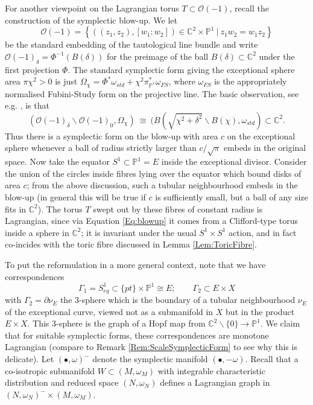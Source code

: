 \documentclass[reqno,10pt]{amsart}
\numberwithin{equation}{section}
\newcommand{\bC}{{\mathbb C}}
\newcommand{\bP}{{\mathbb P}}
\theoremstyle{remark}
\begin{document}
For another viewpoint on the Lagrangian torus $T \subset \mathcal{O}(-1)$, recall the construction of the symplectic blow-up.  We let 
\[
\mathcal{O}(-1) = \left \{ ((z_1,z_2), [w_1:w_2]) \in \bC^2 \times \bP^1 \ \big| \ z_1w_2=w_1z_2\right\}
\]
be the standard embedding of the tautological line bundle and write $\mathcal{O}(-1)_{\delta} = \Phi^{-1}(B(\delta))$ for the preimage of the ball $B(\delta) \subset \bC^2$ under the first projection $\Phi$. The standard symplectic form giving the exceptional sphere area $\pi\chi^2 > 0$ is just $\Omega_{\chi} = \Phi^*\omega_{std} + \chi^2 \pi_{\bP^1}^* \omega_{FS}$, where $\omega_{FS}$ is the appropriately normalised Fubini-Study form on the projective line.  The basic observation, see e.g. \cite[Lemma 7.11]{McD-S}, is that
\begin{equation} \label{Eq:blowup}
(\mathcal{O}(-1)_{\delta} \backslash \mathcal{O}(-1)_0, \Omega_{\chi}) \ \cong \ (B(\sqrt{\chi^2 + \delta^2} \backslash B(\chi), \omega_{std}) \subset \bC^2.
\end{equation}
Thus there is a symplectic form on the blow-up with area $c$ on the exceptional sphere whenever a ball of radius strictly larger than $c/\sqrt{\pi}$ embeds in the original space. Now take the equator $S^1 \subset \bP^1 = E$ inside the exceptional divisor.  Consider the union of the circles inside fibres lying over the equator which bound disks of area $c$; from the above discussion, such a tubular neighbourhood embeds in the blow-up (in general this will be true if $c$ is sufficiently small, but a ball of any size fits in $\bC^2$).  The torus $T$ swept out by these fibres of constant radius is Lagrangian, since via Equation \ref{Eq:blowup} it comes from a Clifford-type torus inside a sphere in $\bC^2$; it is invariant under the usual $S^1 \times S^1$ action, and in fact co-incides with  the toric fibre discussed in Lemma \ref{Lem:ToricFibre}.   

To put the reformulation in a more general context, note that we have correspondences
\begin{equation}\label{Eqn:correspondences}
\Gamma_1 = S^1_{eq} \subset \{pt\} \times \bP^1 \cong E; \qquad \Gamma_2 \subset E \times X
\end{equation}
with $\Gamma_2 = \partial \nu_E$ the 3-sphere which is the boundary of a tubular neighbourhood $\nu_E$ of the exceptional curve, viewed not as a submanifold in $X$ but in the product $E\times X$.  This 3-sphere is the graph of a Hopf map from $\bC^2\backslash \{0\} \rightarrow \bP^1$.  We claim that for suitable symplectic forms, these correspondences are monotone Lagrangian (compare to Remark \ref{Rem:ScaleSymplecticForm} to see why this is delicate).  Let $(\bullet,\omega)^-$ denote the symplectic manifold $(\bullet, -\omega)$.  Recall that a co-isotropic submanifold $W \subset (M,\omega_M)$ with integrable characteristic distribution and reduced space $(N, \omega_N)$ defines a Lagrangian graph in $(N,\omega_N)^- \times (M,\omega_M)$.
\end{document}
